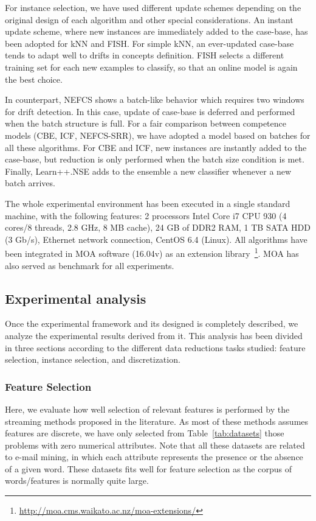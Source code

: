 \documentclass[preprint,12pt]{elsarticle}
\begin{document}
For instance selection, we have used different update schemes depending on the original design of each algorithm and other special considerations. An instant update scheme, where new instances are immediately added to the case-base, has been adopted for kNN and FISH. For simple kNN, an ever-updated case-base tends to adapt well to drifts in concepts definition. FISH selects a different training set for each new examples to classify, so that an online model is again the best choice. 

In counterpart, NEFCS shows a batch-like behavior which requires two windows for drift detection. In this case, update of case-base is deferred and performed when the batch structure is full. For a fair comparison between competence models (CBE, ICF, NEFCS-SRR), we have adopted a model based on batches for all these algorithms. For CBE and ICF, new instances are instantly added to the case-base, but reduction is only performed when the batch size condition is met. Finally, Learn++.NSE adds to the ensemble a new classifier whenever a new batch arrives. 

The whole experimental environment has been executed in a single standard machine, with the following features: 2 processors Intel Core i7 CPU 930 (4 cores/8 threads, 2.8 GHz, 8 MB cache), 24 GB of DDR2 RAM, 1 TB SATA HDD (3 Gb/s), Ethernet network connection, CentOS 6.4 (Linux). All algorithms have been integrated in MOA software (16.04v) as an extension library~\footnote{\url{http://moa.cms.waikato.ac.nz/moa-extensions/}}. MOA has also served as benchmark for all experiments.

\subsection{Experimental analysis}

Once the experimental framework and its designed is completely described, we analyze the experimental results derived from it. This analysis has been divided in three sections according to the different data reductions tasks studied: feature selection, instance selection, and discretization.

\subsubsection*{\textbf{Feature Selection}}
\label{subsubsec:fsel}

Here, we evaluate how well selection of relevant features is performed by the streaming methods proposed in the literature. As most of these methods assumes features are discrete, we have only selected from Table~\ref{tab:datasets} those problems with zero numerical attributes. Note that all these datasets are related to e-mail mining, in which each attribute represents the presence or the absence of a given word. These datasets fits well for feature selection as the corpus of words/features is normally quite large.
\end{document}
